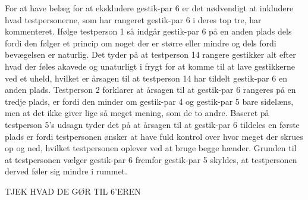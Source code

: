 For at have belæg for at ekskludere gestik-par 6 er det nødvendigt at inkludere hvad testpersonerne, som har rangeret gestik-par 6 i deres top tre, har kommenteret. Ifølge testperson 1 så indgår gestik-par 6 på en anden plads dels fordi den følger et princip om noget der er større eller mindre og dels fordi bevægelsen er naturlig. Det tyder på at testperson 14 rangere gestikker alt efter hvad der føles akavede og unaturligt i frygt for at komme til at lave gestikkerne ved et uheld, hvilket er årsagen til at testperson 14 har tildelt gestik-par 6 en anden plads. Testperson 2 forklarer at årsagen til at gestik-par 6 rangeres på en tredje plads, er fordi den minder om gestik-par 4 og gestik-par 5 bare sidelæns, men at det ikke giver lige så meget mening, som de to andre. Baseret på testperson 5's udsagn tyder det på at årsagen til at gestik-par 6 tildeles en første plads er fordi testpersonen ønsker at have fuld kontrol over hvor meget der skrues op og ned, hvilket testpersonen oplever ved at bruge begge hænder. Grunden til at testpersonen vælger gestik-par 6 fremfor gestik-par 5 skyldes, at testpersonen derved føler sig mindre i rummet.      

TJEK HVAD DE GØR TIL 6'EREN






